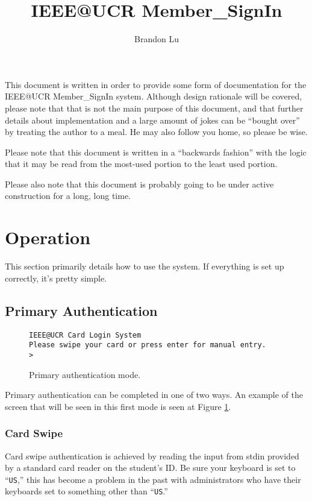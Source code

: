 \documentclass[12pt]{article}
\begin{document}
\title{IEEE@UCR Member\_SignIn}
\author{Brandon Lu}
\maketitle

This document is written in order to provide some form of documentation for
the IEEE@UCR Member\_SignIn system.  Although design rationale will be
covered, please note that that is not the main purpose of this document,
and that further details about implementation and a large amount of jokes
can be ``bought over'' by treating the author to a meal.  He may also follow
you home, so please be wise.

Please note that this document is written in a ``backwards fashion'' with the 
logic that it may be read from the most-used portion to the least used
portion.

Please also note that this document is probably going to be under active
construction for a long, long time.
\newpage

\section{Operation}
This section primarily details how to use the system.  If everything is set up
correctly, it's pretty simple.

\subsection{Primary Authentication}
\begin{figure}[h]
{\tt IEEE@UCR Card Login System\\
Please swipe your card or press enter for manual entry.\\
> }
\caption{Primary authentication mode.}
\label{fig:pauth}
\end{figure}
Primary authentication can be completed in one of two ways.  An example of
the screen that will be seen in this first mode is seen at Figure
\ref{fig:pauth}.
\subsubsection{Card Swipe}
Card swipe authentication is achieved by reading the input from stdin provided
by a standard card reader on the student's ID.  Be sure your keyboard is set
to ``{\tt US},'' this has become a problem in the past with administrators who have
their keyboards set to something other than ``{\tt US}.''
\end{document}
